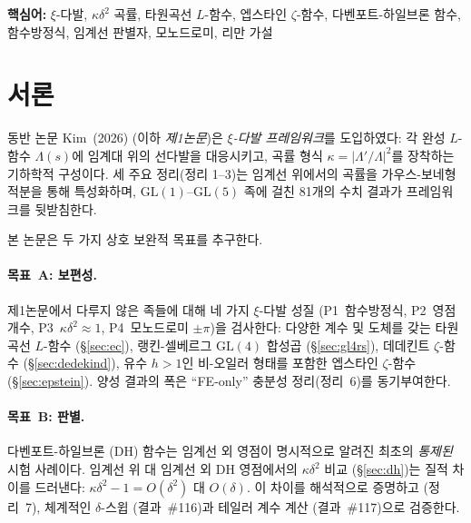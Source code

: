 \documentclass[11pt, a4paper]{article}
\theoremstyle{plain}
\theoremstyle{definition}
\begin{document}
\vspace{0.5em}
\noindent\textbf{핵심어:} $\xi$-다발, $\kappa\delta^{2}$ 곡률,
타원곡선 $L$-함수, 엡스타인 $\zeta$-함수, 다벤포트-하일브론 함수,
함수방정식, 임계선 판별자, 모노드로미, 리만 가설

\tableofcontents
\newpage


\section{서론}
\label{sec:intro}

동반 논문 Kim~(2026) (이하 \textit{제1논문})은
\emph{$\xi$-다발 프레임워크}를 도입하였다:
각 완성 $L$-함수 $\Lambda(s)$에 임계대 위의 선다발을 대응시키고,
곡률 형식 $\kappa = |\Lambda'/\Lambda|^{2}$를 장착하는 기하학적 구성이다.
세 주요 정리(정리 1--3)는 임계선 위에서의 곡률을
가우스-보네형 적분을 통해 특성화하며,
$\mathrm{GL}(1)$--$\mathrm{GL}(5)$ 족에 걸친
81개의 수치 결과가 프레임워크를 뒷받침한다.

본 논문은 두 가지 상호 보완적 목표를 추구한다.

\paragraph{목표~A: 보편성.}
제1논문에서 다루지 않은 족들에 대해
네 가지 $\xi$-다발 성질 (P1~함수방정식, P2~영점 개수,
P3~$\kappa\delta^{2}\approx 1$, P4~모노드로미 $\pm\pi$)을 검사한다:
다양한 계수 및 도체를 갖는 타원곡선 $L$-함수 (\S\ref{sec:ec}),
랭킨-셀베르그 $\mathrm{GL}(4)$ 합성곱 (\S\ref{sec:gl4rs}),
데데킨트 $\zeta$-함수 (\S\ref{sec:dedekind}),
유수 $h>1$인 비-오일러 형태를 포함한 엡스타인 $\zeta$-함수
(\S\ref{sec:epstein}).
양성 결과의 폭은 ``FE-only'' 충분성 정리(정리~6)를 동기부여한다.

\paragraph{목표~B: 판별.}
다벤포트-하일브론 (DH) 함수는 임계선 외 영점이
명시적으로 알려진 최초의 \emph{통제된} 시험 사례이다.
임계선 위 대 임계선 외 DH 영점에서의 $\kappa\delta^{2}$ 비교
(\S\ref{sec:dh})는 질적 차이를 드러낸다:
$\kappa\delta^{2}-1 = O(\delta^{2})$ 대 $O(\delta)$.
이 차이를 해석적으로 증명하고 (정리~7),
체계적인 $\delta$-스윕 (결과~\#116)과
테일러 계수 계산 (결과~\#117)으로 검증한다.
\end{document}
